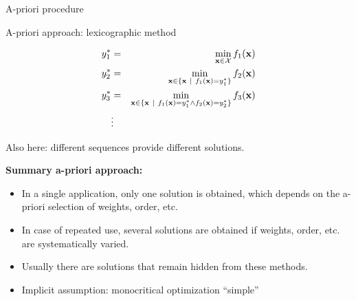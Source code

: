 \begin{frame}[allowframebreaks]{A-priori procedure}
\framebreak

A-priori approach: lexicographic method

\begin{eqnarray*}
y_1^* &=& \min_{\mathbf{x} \in \mathcal{X}} f_1(\mathbf{x})\\
y_2^* &=& \min_{\mathbf{x} \in \{\mathbf{x} ~|~ f_1(\mathbf{x}) = y_1^*\}} f_2(\mathbf{x}) \\
y_3^* &=& \min_{\mathbf{x} \in \{\mathbf{x} ~|~ f_1(\mathbf{x}) = y_1^* \land f_2(\mathbf{x}) = y_2^*\}} f_3(\mathbf{x}) \\
&\vdots&
\end{eqnarray*}

Also here: different sequences provide different solutions.

\framebreak

\textbf{Summary a-priori approach:}
\begin{itemize}
\item In a single application, only one solution is obtained, which depends on the a-priori selection of weights, order, etc.
\item In case of repeated use, several solutions are obtained if weights, order, etc. are systematically varied.
\item Usually there are solutions that remain hidden from these methods.
\item Implicit assumption: monocritical optimization \enquote{simple}
\end{itemize}

\end{frame}

